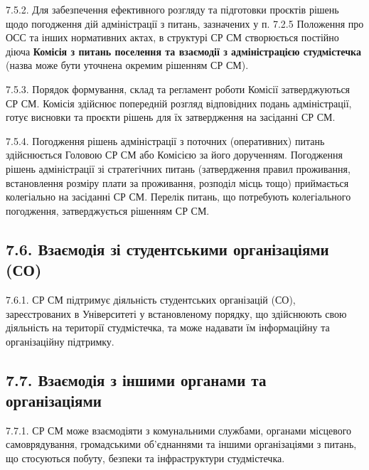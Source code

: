     7.5.2. Для забезпечення ефективного розгляду та підготовки проєктів рішень щодо погодження дій адміністрації з питань, зазначених у п. 7.2.5 Положення про ОСС та інших нормативних актах, в структурі СР СМ створюється постійно діюча \textbf{Комісія з питань поселення та взаємодії з адміністрацією студмістечка} (назва може бути уточнена окремим рішенням СР СМ).

    7.5.3. Порядок формування, склад та регламент роботи Комісії затверджуються СР СМ. Комісія здійснює попередній розгляд відповідних подань адміністрації, готує висновки та проєкти рішень для їх затвердження на засіданні СР СМ.

    7.5.4. Погодження рішень адміністрації з поточних (оперативних) питань здійснюється Головою СР СМ або Комісією за його дорученням. Погодження рішень адміністрації зі стратегічних питань (затвердження правил проживання, встановлення розміру плати за проживання, розподіл місць тощо) приймається колегіально на засіданні СР СМ. Перелік питань, що потребують колегіального погодження, затверджується рішенням СР СМ.

\subsection*{7.6. Взаємодія зі студентськими організаціями (СО)}
    7.6.1. СР СМ підтримує діяльність студентських організацій (СО), зареєстрованих в Університеті у встановленому порядку, що здійснюють свою діяльність на території студмістечка, та може надавати їм інформаційну та організаційну підтримку.

\subsection*{7.7. Взаємодія з іншими органами та організаціями}
    7.7.1. СР СМ може взаємодіяти з комунальними службами, органами місцевого самоврядування, громадськими об'єднаннями та іншими організаціями з питань, що стосуються побуту, безпеки та інфраструктури студмістечка.
